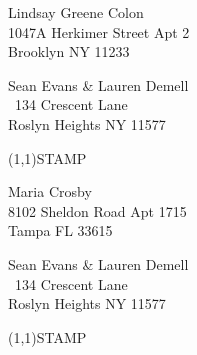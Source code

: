 \documentclass[12pt]{article}
\begin{document}
\begin{center} \begin{Huge} \vspace*{\fill}
Lindsay Greene Colon\\
1047A Herkimer Street Apt 2\\
Brooklyn NY 11233\\
\vspace{\fill} \end{Huge} \end{center}

\clearpage

\begin{minipage}{.5\linewidth} \noindent
Sean Evans \& Lauren Demell\\\ 
134 Crescent Lane\\ 
Roslyn Heights NY 11577
\end{minipage}
\begin{minipage}{.5\linewidth \hspace{-.2in} \vspace{-.3in}}
\begin{flushright}
\framebox(1,1){STAMP}
\end{flushright}
\end{minipage}

\begin{center} \begin{Huge} \vspace*{\fill}
Maria Crosby\\
8102 Sheldon Road Apt 1715\\
Tampa FL 33615\\
\vspace{\fill} \end{Huge} \end{center}

\clearpage

\begin{minipage}{.5\linewidth} \noindent
Sean Evans \& Lauren Demell\\\ 
134 Crescent Lane\\ 
Roslyn Heights NY 11577
\end{minipage}
\begin{minipage}{.5\linewidth \hspace{-.2in} \vspace{-.3in}}
\begin{flushright}
\framebox(1,1){STAMP}
\end{flushright}
\end{minipage}
\end{document}
